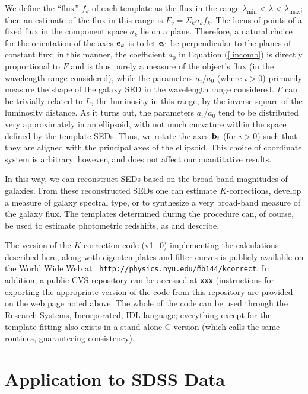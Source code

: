 \documentclass[10pt,preprint]{aastex}
\newcommand{\vv}[1]{{\bf #1}}
\begin{document}
We define the ``flux'' $f_k$ of each template as the flux in the range
$\lambda_{\mathrm{min}}<\lambda<\lambda_{\mathrm{max}}$; then an
estimate of the flux in this range is $F_{{v}}=\Sigma_k a_k f_k$. The
locus of points of a fixed flux in the component space $a_k$ lie on a
plane. Therefore, a natural choice for the orientation of the axes
$\vv{e}_k$ is to let $\vv{e}_0$ be perpendicular to the planes of
constant flux; in this manner, the coefficient $a_0$ in Equation
(\ref{lincomb}) is directly proportional to $F$ and is thus purely a
measure of the object's flux (in the wavelength range considered),
while the parameters $a_i/a_0$ (where $i>0$) primarily measure the
shape of the galaxy SED in the wavelength range considered. $F$ can be
trivially related to $L$, the luminosity in this range, by the inverse
square of the luminosity distance.  As it turns out, the parameters
$a_i/a_0$ tend to be distributed very approximately in an ellipsoid,
with not much curvature within the space defined by the template
SEDs. Thus, we rotate the axes $\vv{b}_i$ (for $i>0$) such that they
are aligned with the principal axes of the ellipsoid. This choice of
coordinate system is arbitrary, however, and does not affect our
quantitative results.

In this way, we can reconstruct SEDs based on the broad-band
magnitudes of galaxies. From these reconstructed SEDs one can estimate
$K$-corrections, develop a measure of galaxy spectral type, or to
synthesize a very broad-band measure of the galaxy flux.  The
templates determined during the procedure can, of course, be used to
estimate photometric redshifts, as \citet{csabai00a} and
\citet{budavari00a} describe.

The version of the $K$-correction code (v1\_0) implementing the
calculations described here, along with eigentemplates and filter
curves is publicly available on the World Wide Web at {\tt
http://physics.nyu.edu/\~mb144/kcorrect}. In addition, a public CVS
repository can be accessed at {\tt xxx} (instructions for exporting
the appropriate version of the code from this repository are provided
on the web page noted above. The whole of the code can be used through
the Research Systems, Incorporated, IDL language; everything except
for the template-fitting also exists in a stand-alone C version (which
calls the same routines, guaranteeing consistency).

\section{Application to SDSS Data}
\label{data}
\end{document}
